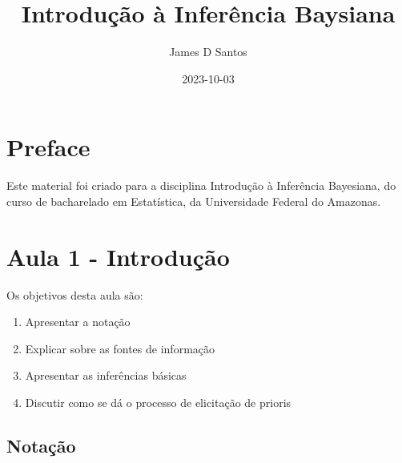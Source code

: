 \documentclass[
  letterpaper,
  DIV=11,
  numbers=noendperiod]{scrreprt}
\title{Introdução à Inferência Baysiana}
\author{James D Santos}
\date{2023-10-03}
\providecommand{\tightlist}{%
  \setlength{\itemsep}{0pt}\setlength{\parskip}{0pt}}\usepackage{longtable,booktabs,array}
\renewcommand*\contentsname{Table of contents}
\newcommand\contentsname{Table of contents}
\theoremstyle{definition}
\theoremstyle{definition}
\theoremstyle{remark}
\begin{document}
\maketitle
\ifdefined\Shaded\renewenvironment{Shaded}{\begin{tcolorbox}[enhanced, frame hidden, interior hidden, boxrule=0pt, borderline west={3pt}{0pt}{shadecolor}, breakable, sharp corners]}{\end{tcolorbox}}\fi

\renewcommand*\contentsname{Table of contents}
{
\hypersetup{linkcolor=}
\setcounter{tocdepth}{2}
\tableofcontents
}

\hypertarget{preface}{%
\chapter*{Preface}\label{preface}}


Este material foi criado para a disciplina Introdução à Inferência
Bayesiana, do curso de bacharelado em Estatística, da Universidade
Federal do Amazonas.


\hypertarget{section}{%
\chapter{}\label{section}}


\hypertarget{aula-1---introduuxe7uxe3o}{%
\chapter{Aula 1 - Introdução}\label{aula-1---introduuxe7uxe3o}}

Os objetivos desta aula são:

\begin{enumerate}
\def\labelenumi{\arabic{enumi}.}
\tightlist
\item
  Apresentar a notação
\item
  Explicar sobre as fontes de informação
\item
  Apresentar as inferências básicas
\item
  Discutir como se dá o processo de elicitação de prioris
\end{enumerate}

\hypertarget{notauxe7uxe3o}{%
\section{Notação}\label{notauxe7uxe3o}}
\end{document}
